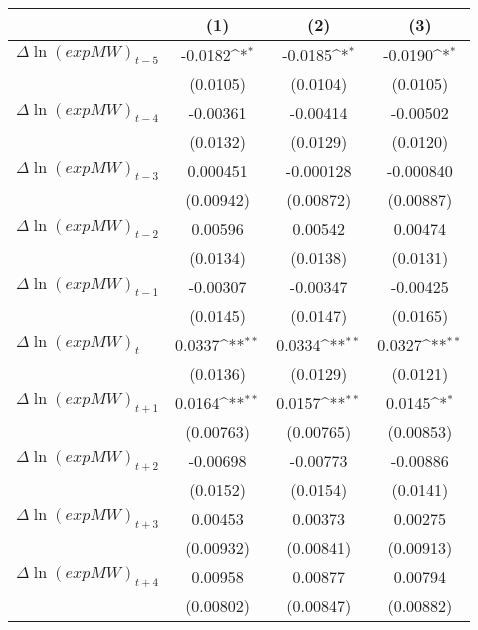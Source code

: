 {
\def\sym#1{\ifmmode^{#1}\else\(^{#1}\)\fi}
\begin{tabular}{l*{3}{c}}
\hline\hline
          &\multicolumn{1}{c}{(1)}         &\multicolumn{1}{c}{(2)}         &\multicolumn{1}{c}{(3)}         \\
\hline
$\Delta \ln(exp MW)_{t-5}$&  -0.0182\sym{*}  &  -0.0185\sym{*}  &  -0.0190\sym{*}  \\
          & (0.0105)         & (0.0104)         & (0.0105)         \\
[1em]
$\Delta \ln(exp MW)_{t-4}$& -0.00361         & -0.00414         & -0.00502         \\
          & (0.0132)         & (0.0129)         & (0.0120)         \\
[1em]
$\Delta \ln(exp MW)_{t-3}$& 0.000451         &-0.000128         &-0.000840         \\
          &(0.00942)         &(0.00872)         &(0.00887)         \\
[1em]
$\Delta \ln(exp MW)_{t-2}$&  0.00596         &  0.00542         &  0.00474         \\
          & (0.0134)         & (0.0138)         & (0.0131)         \\
[1em]
$\Delta \ln(exp MW)_{t-1}$& -0.00307         & -0.00347         & -0.00425         \\
          & (0.0145)         & (0.0147)         & (0.0165)         \\
[1em]
$\Delta \ln(exp MW)_{t}$&   0.0337\sym{**} &   0.0334\sym{**} &   0.0327\sym{**} \\
          & (0.0136)         & (0.0129)         & (0.0121)         \\
[1em]
$\Delta \ln(exp MW)_{t+1}$&   0.0164\sym{**} &   0.0157\sym{**} &   0.0145\sym{*}  \\
          &(0.00763)         &(0.00765)         &(0.00853)         \\
[1em]
$\Delta \ln(exp MW)_{t+2}$& -0.00698         & -0.00773         & -0.00886         \\
          & (0.0152)         & (0.0154)         & (0.0141)         \\
[1em]
$\Delta \ln(exp MW)_{t+3}$&  0.00453         &  0.00373         &  0.00275         \\
          &(0.00932)         &(0.00841)         &(0.00913)         \\
[1em]
$\Delta \ln(exp MW)_{t+4}$&  0.00958         &  0.00877         &  0.00794         \\
          &(0.00802)         &(0.00847)         &(0.00882)         \\

\end{tabular}}
